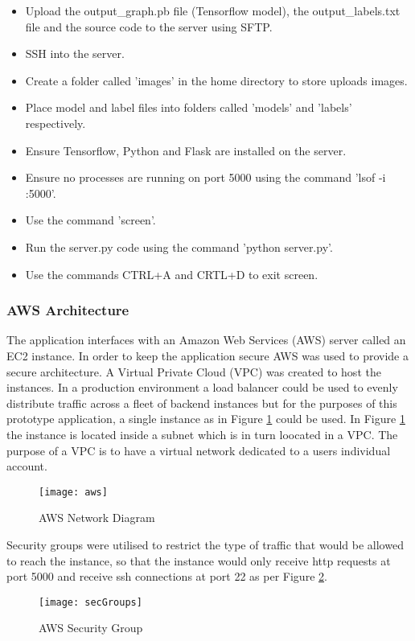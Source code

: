 \begin{itemize}
    \item{Upload the output\_graph.pb file (Tensorflow model), the output\_labels.txt file and the source code to the server using SFTP.}
    \item{SSH into the server.}
    \item{Create a folder called 'images' in the home directory to store uploads images.}
    \item{Place model and label files into folders called 'models' and 'labels' respectively.}
    \item{Ensure Tensorflow, Python and Flask are installed on the server.}
    \item{Ensure no processes are running on port 5000 using the command 'lsof -i :5000'.}
    \item{Use the command 'screen'.}
    \item{Run the server.py code using the command 'python server.py'.}
    \item{Use the commands CTRL+A and CRTL+D to exit screen.}
\end{itemize}

\tocless\subsubsection{AWS Architecture}
The application interfaces with an Amazon Web Services (AWS) server called an EC2 instance.
In order to keep the application secure AWS was used to provide a secure architecture.
A Virtual Private Cloud (VPC) was created to host the instances.
In a production environment a load balancer could be used to evenly distribute traffic across a fleet of backend instances but for the purposes of this prototype application, a single instance as in Figure \ref{fig:aws} could be used.
In Figure \ref{fig:aws} the instance is located inside a subnet which is in turn loocated in a VPC.
The purpose of a VPC is to have a virtual network dedicated to a users individual account. 
\begin{figure}[h]
    \centering
    \texttt{[image: aws]}
    \caption{AWS Network Diagram}
    \label{fig:aws}
\end{figure}

Security groups were utilised to restrict the type of traffic that would be allowed to reach the instance, so that the instance would only receive http requests at port 5000 and receive ssh connections at port 22 as per Figure \ref{fig:awsSecGroup}.
\begin{figure}[h]
    \centering
    \texttt{[image: secGroups]}
    \caption{AWS Security Group}
    \label{fig:awsSecGroup}
\end{figure}

